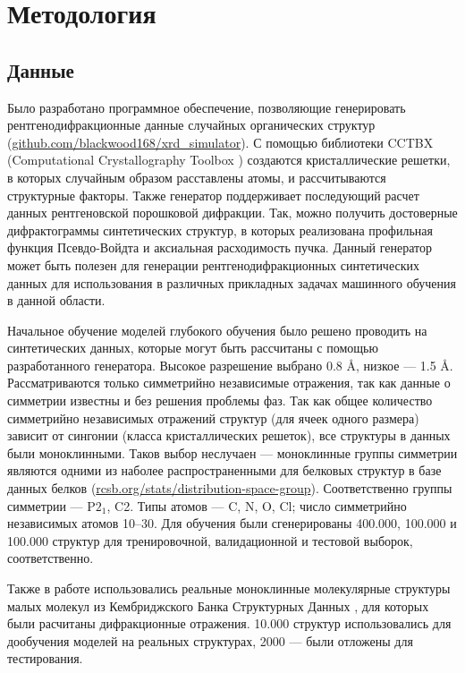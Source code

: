 \section{Методология}

\subsection{Данные}

Было разработано программное обеспечение, позволяющие генерировать рентгенодифракционные данные случайных органических структур (\url{github.com/blackwood168/xrd_simulator}). С помощью библиотеки CCTBX (Computational Crystallography Toolbox \cite{cctbx}) создаются кристаллические решетки, в которых случайным образом расставлены атомы, и рассчитываются структурные факторы. Также генератор поддерживает последующий расчет данных рентгеновской порошковой дифракции. Так, можно получить достоверные дифрактограммы синтетических структур, в которых реализована профильная функция Псевдо-Войдта и аксиальная расходимость пучка. Данный генератор может быть полезен для генерации рентгенодифракционных синтетических данных для использования в различных прикладных задачах машинного обучения в данной области.

Начальное обучение моделей глубокого обучения было решено проводить на синтетических данных, которые могут быть рассчитаны с помощью разработанного генератора. Высокое разрешение выбрано 0.8 Å, низкое --- 1.5 Å. Рассматриваются только симметрийно независимые отражения, так как данные о симметрии известны и без решения проблемы фаз. Так как общее количество симметрийно независимых отражений структур (для ячеек одного размера) зависит от сингонии (класса кристаллических решеток), все структуры в данных были моноклинными. Таков выбор неслучаен --- моноклинные группы симметрии являются одними из наболее распространенными для белковых структур в базе данных белков (\url{rcsb.org/stats/distribution-space-group}). Соответственно группы симметрии --- P$2_1$, C2. Типы атомов --- C, N, O, Cl; число симметрийно независимых атомов 10--30. Для обучения были сгенерированы 400.000, 100.000 и 100.000 структур для тренировочной, валидационной и тестовой выборок, соответственно.

Также в работе использовались реальные моноклинные молекулярные структуры малых молекул из Кембриджского Банка Структурных Данных \cite{csd}, для которых были расчитаны дифракционные отражения. 10.000 структур использовались для дообучения моделей на реальных структурах, 2000 --- были отложены для тестирования.

